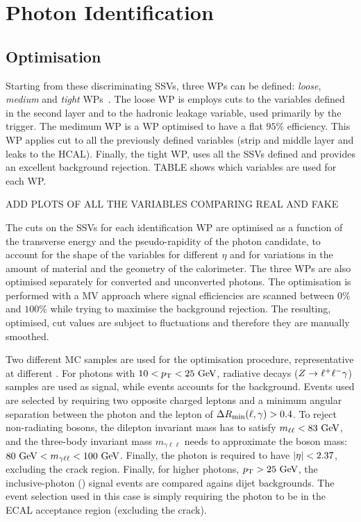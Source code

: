 \section{Photon Identification}


\subsection{Optimisation}
\label{subsec:pid_ss:pid:optimisation}

Starting from these discriminating \acp{SSV}, three \acp{WP} can be defined: \textit{loose}, \textit{medium} and \textit{tight} \acp{WP}~\cite{ATLAS-EGamma-Performance-2024}. The loose \ac{WP} is employs cuts to the variables defined in the second layer and to the hadronic leakage variable, used primarily by the trigger. The medimum \ac{WP} is a \ac{WP} optimised to have a flat \(95\%\) efficiency. This \ac{WP} applies cut to all the previously defined variables (strip and middle layer and leaks to the \ac{HCAL}). Finally, the tight \ac{WP}, uses all the \acp{SSV} defined and provides an excellent background rejection. TABLE shows which variables are used for each \ac{WP}.

ADD PLOTS OF ALL THE VARIABLES COMPARING REAL AND FAKE

The cuts on the \acp{SSV} for each identification \ac{WP} are optimised as a function of the transverse energy and the pseudo-rapidity of the photon candidate, to account for the shape of the variables for different \(\eta\) and for variations in the amount of material and the geometry of the calorimeter. The three \acp{WP} are also optimised separately for converted and unconverted photons.
The optimisation is performed with a \ac{MV} approach where signal efficiencies are scanned between \(0\%\) and \(100\%\) while trying to maximise the background rejection. The resulting, optimised, cut values are subject to fluctuations and therefore they are manually smoothed.

Two different \ac{MC} samples are used for the optimisation procedure, representative at different \ptgam. For photons with \(10<p_{\text{T}}<25~\text{GeV}\), radiative \Zboson decays (\(Z\rightarrow\ell^{+} \ell^{-}\gamma\)) samples are used as signal, while \Zjets events accounts for the background. Events used are selected by requiring two opposite charged leptons and a minimum angular separation between the photon and the lepton of \(\Delta R_{\text{min}}(\ell, \gamma) > 0.4\). To reject non-radiating \Zboson bosons, the dilepton invariant mass has to satisfy \(m_{\ell\ell}<83~\text{GeV}\), and the three-body invariant mass \(m_{\gamma\ell\ell}\) needs to approximate the \Zboson boson mass: \(80~\text{GeV} < m_{\gamma\ell\ell} < 100~\text{GeV}\). Finally, the photon is required to have \(|\eta|<2.37\), excluding the crack region.
Finally, for higher \pt photons, \(p_{\text{T}}>25~\text{GeV}\), the inclusive-photon (\yj) signal events are compared agains dijet backgrounds. The event selection used in this case is simply requiring the photon to be in the \ac{ECAL} acceptance region (excluding the crack).





